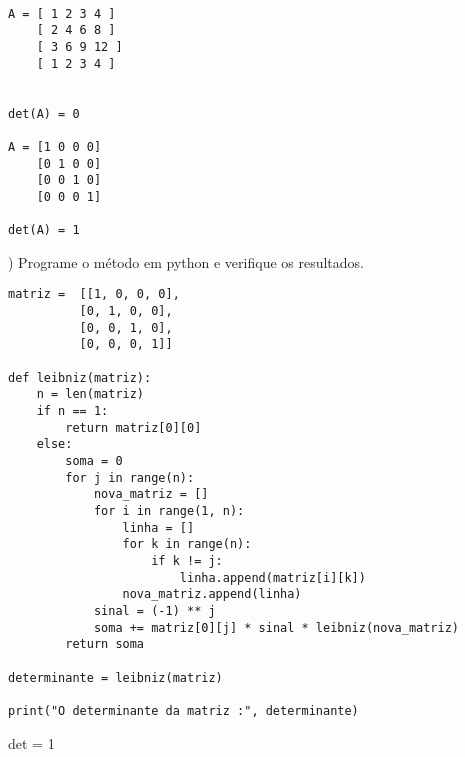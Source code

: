 \documentclass{article}
\begin{document}
\begin{lstlisting}

A = [ 1 2 3 4 ]
    [ 2 4 6 8 ]
    [ 3 6 9 12 ]
    [ 1 2 3 4 ]

    
det(A) = 0

A = [1 0 0 0]
    [0 1 0 0]
    [0 0 1 0]
    [0 0 0 1]
    
det(A) = 1

\end{lstlisting}

) Programe o método em python e verifique os resultados.

\begin{lstlisting}
matriz =  [[1, 0, 0, 0],
          [0, 1, 0, 0],
          [0, 0, 1, 0],
          [0, 0, 0, 1]]

def leibniz(matriz):
    n = len(matriz)
    if n == 1:
        return matriz[0][0]
    else:
        soma = 0
        for j in range(n):
            nova_matriz = []
            for i in range(1, n):
                linha = []
                for k in range(n):
                    if k != j:
                        linha.append(matriz[i][k])
                nova_matriz.append(linha)
            sinal = (-1) ** j
            soma += matriz[0][j] * sinal * leibniz(nova_matriz)
        return soma

determinante = leibniz(matriz)

print("O determinante da matriz :", determinante)
\end{lstlisting}
det = 1
\end{document}
